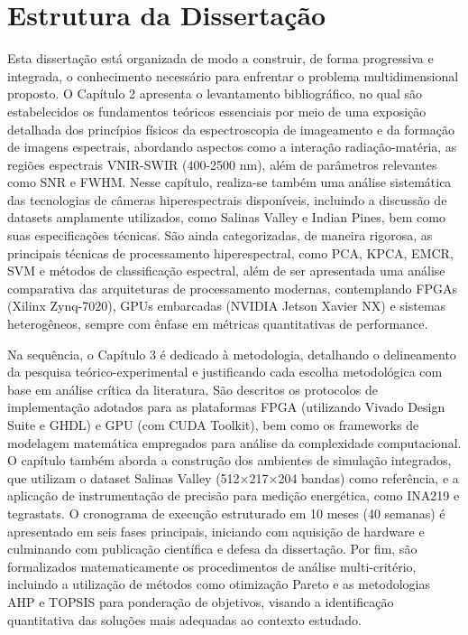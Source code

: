 \section{Estrutura da Dissertação}\label{sec:estrutura}
Esta dissertação está organizada de modo a construir, de forma progressiva e
integrada, o conhecimento necessário para enfrentar o problema multidimensional
proposto. O Capítulo 2 apresenta o levantamento bibliográfico, no qual são
estabelecidos os fundamentos teóricos essenciais por meio de uma exposição
detalhada dos princípios físicos da espectroscopia de imageamento e da formação
de imagens espectrais, abordando aspectos como a interação radiação-matéria,
as regiões espectrais VNIR-SWIR (400-2500 nm), além de parâmetros relevantes
como SNR e FWHM. Nesse capítulo, realiza-se também uma análise sistemática das
tecnologias de câmeras hiperespectrais disponíveis, incluindo a discussão de
datasets amplamente utilizados, como Salinas Valley e Indian Pines, bem como
suas especificações técnicas. São ainda categorizadas, de maneira rigorosa,
as principais técnicas de processamento hiperespectral, como PCA, KPCA, EMCR,
SVM e métodos de classificação espectral, além de ser apresentada uma análise
comparativa das arquiteturas de processamento modernas, contemplando FPGAs
(Xilinx Zynq-7020), GPUs embarcadas (NVIDIA Jetson Xavier NX) e sistemas
heterogêneos, sempre com ênfase em métricas quantitativas de performance.

Na sequência, o Capítulo 3 é dedicado à metodologia, detalhando o delineamento
da pesquisa teórico-experimental e justificando cada escolha metodológica com
base em análise crítica da literatura. São descritos os protocolos de
implementação adotados para as plataformas FPGA (utilizando Vivado Design Suite e
GHDL) e GPU (com CUDA Toolkit), bem como os frameworks de modelagem
matemática empregados para análise da complexidade computacional. O capítulo
também aborda a construção dos ambientes de simulação integrados, que utilizam
o dataset Salinas Valley (512×217×204 bandas) como referência, e a aplicação
de instrumentação de precisão para medição energética, como INA219 e
tegrastats. O cronograma de execução estruturado em 10 meses (40 semanas) é
apresentado em seis fases principais, iniciando com aquisição de hardware e
culminando com publicação científica e defesa da dissertação. Por fim, são
formalizados matematicamente os procedimentos de análise multi-critério,
incluindo a utilização de métodos como otimização Pareto e as metodologias
AHP e TOPSIS para ponderação de objetivos, visando a identificação quantitativa
das soluções mais adequadas ao contexto estudado.